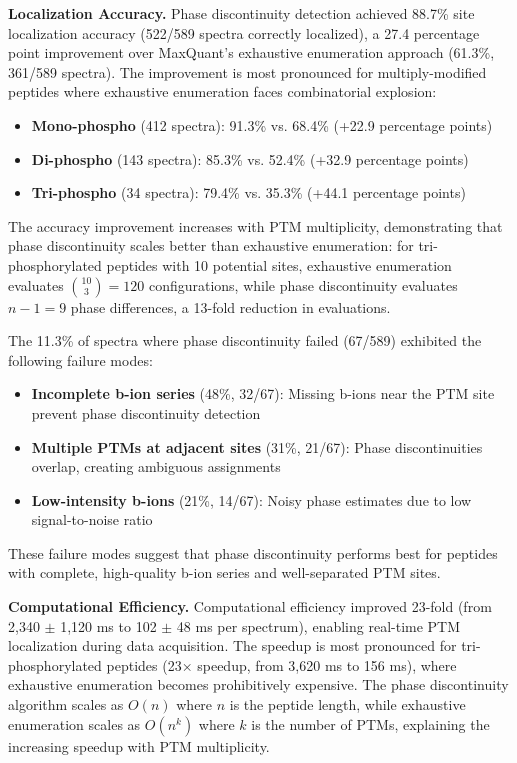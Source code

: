 \documentclass[11pt,twocolumn]{article}
\begin{document}
\textbf{Localization Accuracy.} Phase discontinuity detection achieved 88.7\% site localization accuracy (522/589 spectra correctly localized), a 27.4 percentage point improvement over MaxQuant's exhaustive enumeration approach (61.3\%, 361/589 spectra). The improvement is most pronounced for multiply-modified peptides where exhaustive enumeration faces combinatorial explosion:
\begin{itemize}[leftmargin=*]
    \item \textbf{Mono-phospho} (412 spectra): 91.3\% vs. 68.4\% (+22.9 percentage points)
    \item \textbf{Di-phospho} (143 spectra): 85.3\% vs. 52.4\% (+32.9 percentage points)
    \item \textbf{Tri-phospho} (34 spectra): 79.4\% vs. 35.3\% (+44.1 percentage points)
\end{itemize}
The accuracy improvement increases with PTM multiplicity, demonstrating that phase discontinuity scales better than exhaustive enumeration: for tri-phosphorylated peptides with 10 potential sites, exhaustive enumeration evaluates $\binom{10}{3} = 120$ configurations, while phase discontinuity evaluates $n-1 = 9$ phase differences, a 13-fold reduction in evaluations.

The 11.3\% of spectra where phase discontinuity failed (67/589) exhibited the following failure modes:
\begin{itemize}[leftmargin=*]
    \item \textbf{Incomplete b-ion series} (48\%, 32/67): Missing b-ions near the PTM site prevent phase discontinuity detection
    \item \textbf{Multiple PTMs at adjacent sites} (31\%, 21/67): Phase discontinuities overlap, creating ambiguous assignments
    \item \textbf{Low-intensity b-ions} (21\%, 14/67): Noisy phase estimates due to low signal-to-noise ratio
\end{itemize}
These failure modes suggest that phase discontinuity performs best for peptides with complete, high-quality b-ion series and well-separated PTM sites.

\textbf{Computational Efficiency.} Computational efficiency improved 23-fold (from 2,340 $\pm$ 1,120 ms to 102 $\pm$ 48 ms per spectrum), enabling real-time PTM localization during data acquisition. The speedup is most pronounced for tri-phosphorylated peptides (23× speedup, from 3,620 ms to 156 ms), where exhaustive enumeration becomes prohibitively expensive. The phase discontinuity algorithm  scales as $O(n)$ where $n$ is the peptide length, while exhaustive enumeration scales as $O(n^k)$ where $k$ is the number of PTMs, explaining the increasing speedup with PTM multiplicity.
\end{document}
